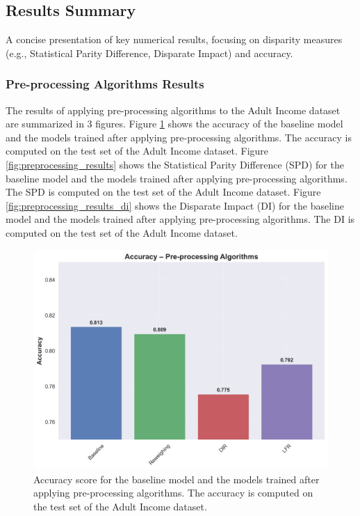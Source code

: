 \documentclass[12pt,a4paper,openright,twoside]{book}
\begin{document}
\subsection{Results Summary}
A concise presentation of key numerical results, focusing on disparity measures (e.g., Statistical Parity Difference, Disparate Impact) and accuracy.
\subsubsection{Pre-processing Algorithms Results}
The results of applying pre-processing algorithms to the Adult Income dataset are summarized in 3 figures. Figure \ref{fig:baseline_results} shows the accuracy of the baseline model and the models trained after applying pre-processing algorithms. The accuracy is computed on the test set of the Adult Income dataset.
Figure \ref{fig:preprocessing_results} shows the Statistical Parity Difference (SPD) for the baseline model and the models trained after applying pre-processing algorithms. The SPD is computed on the test set of the Adult Income dataset. Figure \ref{fig:preprocessing_results_di} shows the Disparate Impact (DI) for the baseline model and the models trained after applying pre-processing algorithms. The DI is computed on the test set of the Adult Income dataset.

\begin{figure}
    \centering
    \includegraphics[width=\textwidth]{figures/preprocessing_results/preprocessing_accuracy_comparison.png}
    \caption{Accuracy score for the baseline model and the models trained after applying pre-processing algorithms. The accuracy is computed on the test set of the Adult Income dataset.}
    \label{fig:baseline_results}
\end{figure}
\end{document}
